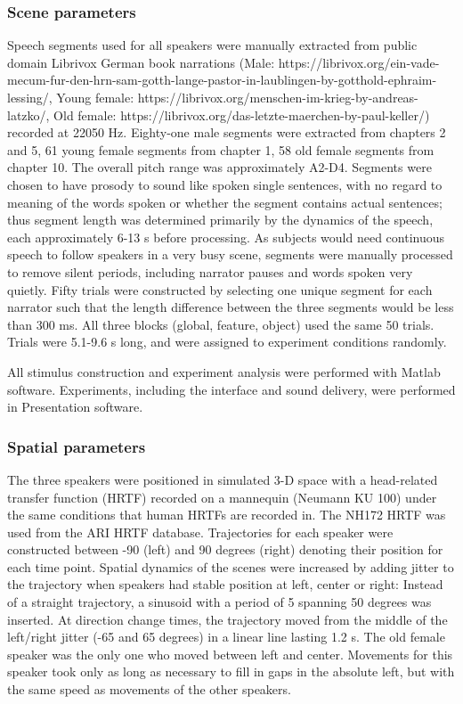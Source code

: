 \documentclass[9pt,twocolumn,twoside]{pnas-new}
\begin{document}
{\subsubsection{Scene parameters} Speech segments used for all speakers were manually extracted from public domain Librivox German book narrations (Male: https://librivox.org/ein-vade-mecum-fur-den-hrn-sam-gotth-lange-pastor-in-laublingen-by-gotthold-ephraim-lessing/, Young female: https://librivox.org/menschen-im-krieg-by-andreas-latzko/, Old female: https://librivox.org/das-letzte-maerchen-by-paul-keller/) recorded at 22050 Hz. Eighty-one male segments were extracted from chapters 2 and 5, 61 young female segments from chapter 1, 58 old female segments from chapter 10. The overall pitch range was approximately A2-D4. Segments were chosen to have prosody to sound like spoken single sentences, with no regard to meaning of the words spoken or whether the segment contains actual sentences; thus segment length was determined primarily by the dynamics of the speech, each approximately 6-13 s before processing. As subjects would need continuous speech to follow speakers in a very busy scene, segments were manually processed to remove silent periods, including narrator pauses and words spoken very quietly. Fifty trials were constructed by selecting one unique segment for each narrator such that the length difference between the three segments would be less than 300 ms. All three blocks (global, feature, object) used the same 50 trials. Trials were 5.1-9.6 s long, and were assigned to experiment conditions randomly. 

All stimulus construction and experiment analysis were performed with Matlab software. Experiments, including the interface and sound delivery, were performed in Presentation software. 

\subsubsection{Spatial parameters} The three speakers were positioned in simulated 3-D space with a head-related transfer function (HRTF) recorded on a mannequin (Neumann KU 100) under the same conditions that human HRTFs are recorded in. The NH172 HRTF was used from the ARI HRTF database. Trajectories for each speaker were constructed between -90 (left) and 90 degrees (right) denoting their position for each time point. Spatial dynamics of the scenes were increased by adding jitter to the trajectory when speakers had stable position at left, center or right: Instead of a straight trajectory, a sinusoid with a period of 5 spanning 50 degrees was inserted. At direction change times, the trajectory moved from the middle of the left/right jitter (-65 and 65 degrees) in a linear line lasting 1.2 s. The old female speaker was the only one who moved between left and center. Movements for this speaker took only as long as necessary to fill in gaps in the absolute left, but with the same speed as movements of the other speakers.

}
\end{document}
